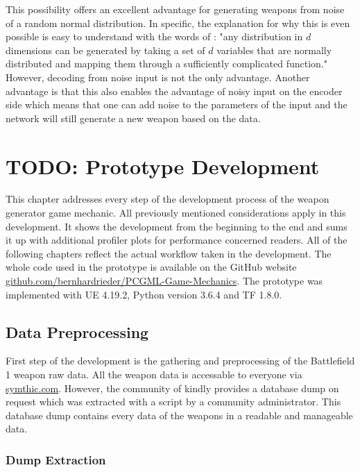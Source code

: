 \documentclass[MGS,Master,english]{twbook}%
\begin{document}
This possibility offers an excellent advantage for generating weapons from noise of a random normal distribution. In specific, the explanation for why this is even possible is easy to understand with the words of \citep{ml::vae::tutorial}: "any distribution in $d$ dimensions can be generated by taking a set of $d$ variables that are normally distributed and mapping them through a sufficiently complicated function."\\
However, decoding from noise input is not the only advantage. Another advantage is that this also enables the advantage of noisy input on the encoder side which means that one can add noise to the parameters of the input and the network will still generate a new weapon based on the data. 


%
%
\clearpage
\chapter{TODO: Prototype Development}
This chapter addresses every step of the development process of the weapon generator game mechanic. All previously mentioned considerations apply in this development. It shows the development from the beginning to the end and sums it up with additional profiler plots for performance concerned readers. All of the following chapters reflect the actual workflow taken in the development. The whole code used in the prototype is available on the GitHub website \url{github.com/bernhardrieder/PCGML-Game-Mechanics}. The prototype was implemented with UE 4.19.2, Python version 3.6.4 and TF 1.8.0. 

\section{Data Preprocessing}
First step of the development is the gathering and preprocessing of the Battlefield 1 weapon raw data. All the weapon data is accessable to everyone via \url{symthic.com}. However, the community of \citep{symthic::bf1stats} kindly provides a database dump on request which was extracted with a script by a community administrator. This database dump contains every data of the weapons in a readable and manageable data.

\subsection{Dump Extraction}
\end{document}
